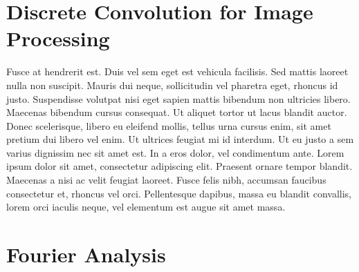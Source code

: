 \documentclass{sydeStyle}
\begin{document}



\section*{Discrete Convolution for Image Processing}
Fusce at hendrerit est. Duis vel sem eget est vehicula facilisis. Sed
mattis laoreet nulla non suscipit. Mauris dui neque, sollicitudin vel
pharetra eget, rhoncus id justo. Suspendisse volutpat nisi eget sapien
mattis bibendum non ultricies libero. Maecenas bibendum cursus consequat.
Ut aliquet tortor ut lacus blandit auctor. Donec scelerisque, libero eu
eleifend mollis, tellus urna cursus enim, sit amet pretium dui libero vel
enim. Ut ultrices feugiat mi id interdum. Ut eu justo a sem varius
dignissim nec sit amet est. In a eros dolor, vel condimentum ante. Lorem
ipsum dolor sit amet, consectetur adipiscing elit. Praesent ornare tempor
blandit. Maecenas a nisi ac velit feugiat laoreet. Fusce felis nibh,
accumsan faucibus consectetur et, rhoncus vel orci. Pellentesque dapibus,
massa eu blandit convallis, lorem orci iaculis neque, vel elementum est
augue sit amet massa.

\section*{Fourier Analysis}




\end{document}
